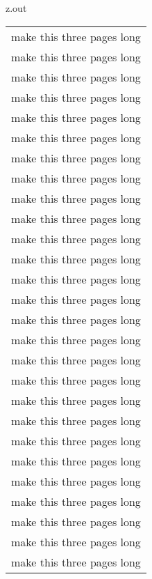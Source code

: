 \begin{VerbatimOut}{z.out}
\begin{longtable}{@{}ll@{}}
  \multicolumn{2}{c}{make this three pages long}\\
  \multicolumn{2}{c}{make this three pages long}\\
  \multicolumn{2}{c}{make this three pages long}\\
  \multicolumn{2}{c}{make this three pages long}\\
  \multicolumn{2}{c}{make this three pages long}\\
  \multicolumn{2}{c}{make this three pages long}\\
  \multicolumn{2}{c}{make this three pages long}\\
  \multicolumn{2}{c}{make this three pages long}\\
  \multicolumn{2}{c}{make this three pages long}\\
  \multicolumn{2}{c}{make this three pages long}\\
  \multicolumn{2}{c}{make this three pages long}\\
  \multicolumn{2}{c}{make this three pages long}\\
  \multicolumn{2}{c}{make this three pages long}\\
  \multicolumn{2}{c}{make this three pages long}\\
  \multicolumn{2}{c}{make this three pages long}\\
  \multicolumn{2}{c}{make this three pages long}\\
  \multicolumn{2}{c}{make this three pages long}\\
  \multicolumn{2}{c}{make this three pages long}\\
  \multicolumn{2}{c}{make this three pages long}\\
  \multicolumn{2}{c}{make this three pages long}\\
  \multicolumn{2}{c}{make this three pages long}\\
  \multicolumn{2}{c}{make this three pages long}\\
  \multicolumn{2}{c}{make this three pages long}\\
  \multicolumn{2}{c}{make this three pages long}\\
  \multicolumn{2}{c}{make this three pages long}\\
  \multicolumn{2}{c}{make this three pages long}\\
  \multicolumn{2}{c}{make this three pages long}\\
\end{longtable}
\end{VerbatimOut}

